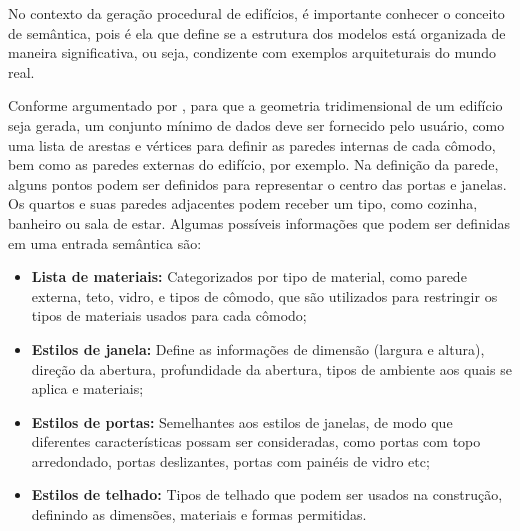 \begin{figure}[h!]
	\centering
	\captionsetup{width=15cm}
	{}
\end{figure}

No contexto da geração procedural de edifícios, é importante conhecer o conceito de semântica, pois é ela que define se a estrutura dos modelos está organizada de maneira significativa, ou seja, condizente com exemplos arquiteturais do mundo real.

Conforme argumentado por , para que a geometria tridimensional de um edifício seja gerada, um conjunto mínimo de dados deve ser fornecido pelo usuário, como uma lista de arestas e vértices para definir as paredes internas de cada cômodo, bem como as paredes externas do edifício, por exemplo. Na definição da parede, alguns pontos podem ser definidos para representar o centro das portas e janelas. Os quartos e suas paredes adjacentes podem receber um tipo, como cozinha, banheiro ou sala de estar. Algumas possíveis informações que podem ser definidas em uma entrada semântica são:

\begin{itemize}
    \item \textbf{Lista de materiais:} Categorizados por tipo de material, como parede externa, teto, vidro, e tipos de cômodo, que são utilizados para restringir os tipos de materiais usados para cada cômodo;
    
    \item \textbf{Estilos de janela:} Define as informações de dimensão (largura e altura), direção da abertura, profundidade da abertura, tipos de ambiente aos quais se aplica e materiais;
    
    \item \textbf{Estilos de portas:} Semelhantes aos estilos de janelas, de modo que diferentes características possam ser consideradas, como portas com topo arredondado, portas deslizantes, portas com painéis de vidro etc;
    
    \item \textbf{Estilos de telhado:} Tipos de telhado que podem ser usados na construção, definindo as dimensões, materiais e formas permitidas.
\end{itemize}

